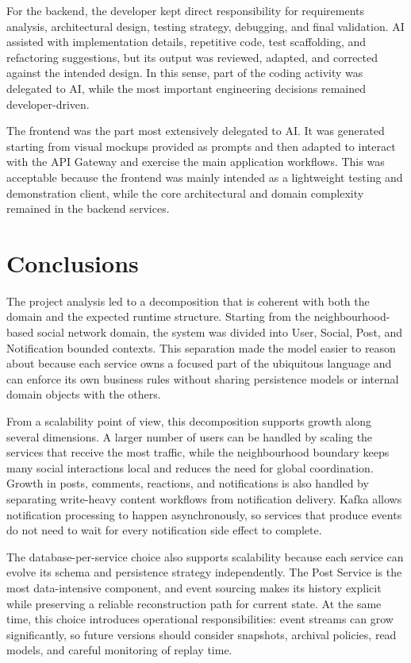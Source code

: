 \documentclass[12pt,a4paper]{article}
\begin{document}
For the backend, the developer kept direct responsibility for requirements analysis, architectural design, testing strategy, debugging, and final validation. AI assisted with implementation details, repetitive code, test scaffolding, and refactoring suggestions, but its output was reviewed, adapted, and corrected against the intended design. In this sense, part of the coding activity was delegated to AI, while the most important engineering decisions remained developer-driven.

The frontend was the part most extensively delegated to AI. It was generated starting from visual mockups provided as prompts and then adapted to interact with the API Gateway and exercise the main application workflows. This was acceptable because the frontend was mainly intended as a lightweight testing and demonstration client, while the core architectural and domain complexity remained in the backend services.

\section{Conclusions}

The project analysis led to a decomposition that is coherent with both the domain and the expected runtime structure. Starting from the neighbourhood-based social network domain, the system was divided into User, Social, Post, and Notification bounded contexts. This separation made the model easier to reason about because each service owns a focused part of the ubiquitous language and can enforce its own business rules without sharing persistence models or internal domain objects with the others.

From a scalability point of view, this decomposition supports growth along several dimensions. A larger number of users can be handled by scaling the services that receive the most traffic, while the neighbourhood boundary keeps many social interactions local and reduces the need for global coordination. Growth in posts, comments, reactions, and notifications is also handled by separating write-heavy content workflows from notification delivery. Kafka allows notification processing to happen asynchronously, so services that produce events do not need to wait for every notification side effect to complete.

The database-per-service choice also supports scalability because each service can evolve its schema and persistence strategy independently. The Post Service is the most data-intensive component, and event sourcing makes its history explicit while preserving a reliable reconstruction path for current state. At the same time, this choice introduces operational responsibilities: event streams can grow significantly, so future versions should consider snapshots, archival policies, read models, and careful monitoring of replay time.
\end{document}
